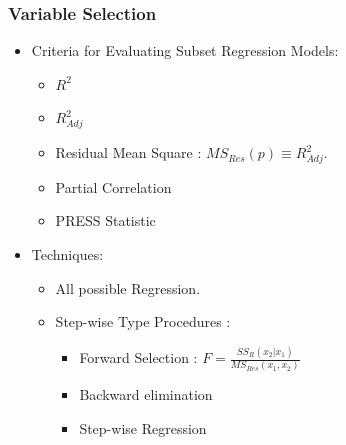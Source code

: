 \documentclass[10pt]{beamer} %
\begin{document}
\begin{frame}
   \frametitle{Variable Selection}
   \begin{itemize}
      \item Criteria for Evaluating Subset Regression Models:
         \vspace{0.45cm}
         \begin{itemize}
            \item $R^2$
               \vspace{0.25cm}
            \item $R^2_{Adj}$
               \vspace{0.25cm}
            \item Residual Mean Square : $MS_{Res}(p) \equiv R^2_{Adj}$.
               \vspace{0.25cm}
            \item Partial Correlation
               \vspace{0.25cm}
            \item PRESS Statistic
         \end{itemize}
         \vspace{0.45cm}
      \item Techniques:
         \begin{itemize}
            \item All possible Regression.
               \vspace{0.25cm}
            \item Step-wise Type Procedures :
               \begin{itemize}
                  \item Forward Selection : $F=\frac{SS_{R}(x_2|x_1)}{MS_{Res}(x_1,x_2)}$
                     \vspace{0.15cm}
                  \item Backward elimination
                     \vspace{0.15cm}
                  \item Step-wise Regression
               \end{itemize}
         \end{itemize}
   \end{itemize}
\end{frame}
\end{document}
